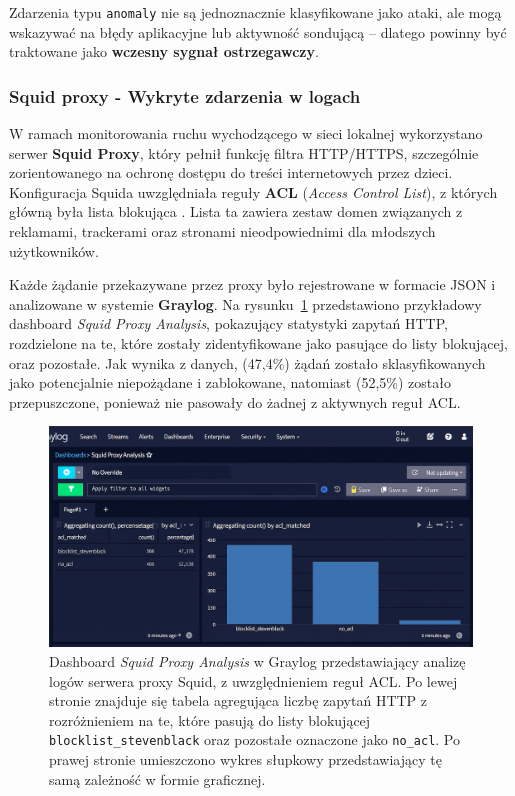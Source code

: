 \documentclass[
    left=2.5cm,         %
    right=2.5cm,        %
    top=2.5cm,          %
    bottom=3cm,         %
    bindingoffset=6mm,  %
    nohyphenation=true %
]{eiti/eiti-thesis} %
\begin{document}
Zdarzenia typu \texttt{anomaly} nie są jednoznacznie klasyfikowane jako ataki, ale mogą wskazywać na błędy aplikacyjne lub aktywność sondującą – dlatego powinny być traktowane jako \textbf{wczesny sygnał ostrzegawczy}.

\subsubsection{Squid proxy - Wykryte zdarzenia w logach}

W ramach monitorowania ruchu wychodzącego w sieci lokalnej wykorzystano serwer \textbf{Squid Proxy}, który pełnił funkcję filtra HTTP/HTTPS, szczególnie zorientowanego na ochronę dostępu do treści internetowych przez dzieci. Konfiguracja Squida uwzględniała reguły \textbf{ACL} (\textit{Access Control List}), z których główną była lista blokująca \cite{stevenblack-blocklist}. Lista ta zawiera zestaw domen związanych z reklamami, trackerami oraz stronami nieodpowiednimi dla młodszych użytkowników.

Każde żądanie przekazywane przez proxy było rejestrowane w formacie JSON i analizowane w systemie \textbf{Graylog}. Na rysunku~\ref{fig:graylog-squid-logs} przedstawiono przykładowy dashboard \textit{Squid Proxy Analysis}, pokazujący statystyki zapytań HTTP, rozdzielone na te, które zostały zidentyfikowane jako pasujące do listy blokującej, oraz pozostałe. Jak wynika z danych, (47{,}4\%) żądań zostało sklasyfikowanych jako potencjalnie niepożądane i zablokowane, natomiast (52{,}5\%) zostało przepuszczone, ponieważ nie pasowały do żadnej z aktywnych reguł ACL.

\newpage
\begin{figure}[H]
    \centering
    \includegraphics[width=\textwidth]{img/graylog_proxy.png}
    \caption{Dashboard \textit{Squid Proxy Analysis} w Graylog przedstawiający analizę logów serwera proxy Squid, z uwzględnieniem reguł ACL. Po lewej stronie znajduje się tabela agregująca liczbę zapytań HTTP z rozróżnieniem na te, które pasują do listy blokującej \texttt{blocklist\_stevenblack} oraz pozostałe oznaczone jako \texttt{no\_acl}. Po prawej stronie umieszczono wykres słupkowy przedstawiający tę samą zależność w formie graficznej.}
    \label{fig:graylog-squid-logs}
\end{figure}
\end{document}
